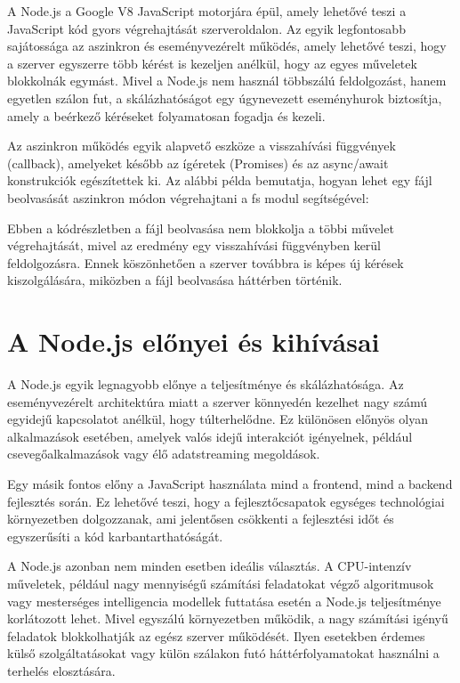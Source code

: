 \documentclass[
]{thesis-ekf}
\theoremstyle{definition}
\theoremstyle{remark}
\begin{document}
A Node.js a Google V8 JavaScript motorjára épül, amely lehetővé teszi a JavaScript kód gyors végrehajtását szerveroldalon. Az egyik legfontosabb sajátossága az aszinkron és eseményvezérelt működés, amely lehetővé teszi, hogy a szerver egyszerre több kérést is kezeljen anélkül, hogy az egyes műveletek blokkolnák egymást. Mivel a Node.js nem használ többszálú feldolgozást, hanem egyetlen szálon fut, a skálázhatóságot egy úgynevezett eseményhurok biztosítja, amely a beérkező kéréseket folyamatosan fogadja és kezeli.

Az aszinkron működés egyik alapvető eszköze a visszahívási függvények (callback), amelyeket később az ígéretek (Promises) és az async/await konstrukciók egészítettek ki. Az alábbi példa bemutatja, hogyan lehet egy fájl beolvasását aszinkron módon végrehajtani a fs modul segítségével:



Ebben a kódrészletben a fájl beolvasása nem blokkolja a többi művelet végrehajtását, mivel az eredmény egy visszahívási függvényben kerül feldolgozásra. Ennek köszönhetően a szerver továbbra is képes új kérések kiszolgálására, miközben a fájl beolvasása háttérben történik.

\section{A Node.js előnyei és kihívásai}
A Node.js egyik legnagyobb előnye a teljesítménye és skálázhatósága. Az eseményvezérelt architektúra miatt a szerver könnyedén kezelhet nagy számú egyidejű kapcsolatot anélkül, hogy túlterhelődne. Ez különösen előnyös olyan alkalmazások esetében, amelyek valós idejű interakciót igényelnek, például csevegőalkalmazások vagy élő adatstreaming megoldások.

Egy másik fontos előny a JavaScript használata mind a frontend, mind a backend fejlesztés során. Ez lehetővé teszi, hogy a fejlesztőcsapatok egységes technológiai környezetben dolgozzanak, ami jelentősen csökkenti a fejlesztési időt és egyszerűsíti a kód karbantarthatóságát.

A Node.js azonban nem minden esetben ideális választás. A CPU-intenzív műveletek, például nagy mennyiségű számítási feladatokat végző algoritmusok vagy mesterséges intelligencia modellek futtatása esetén a Node.js teljesítménye korlátozott lehet. Mivel egyszálú környezetben működik, a nagy számítási igényű feladatok blokkolhatják az egész szerver működését. Ilyen esetekben érdemes külső szolgáltatásokat vagy külön szálakon futó háttérfolyamatokat használni a terhelés elosztására.
\end{document}
